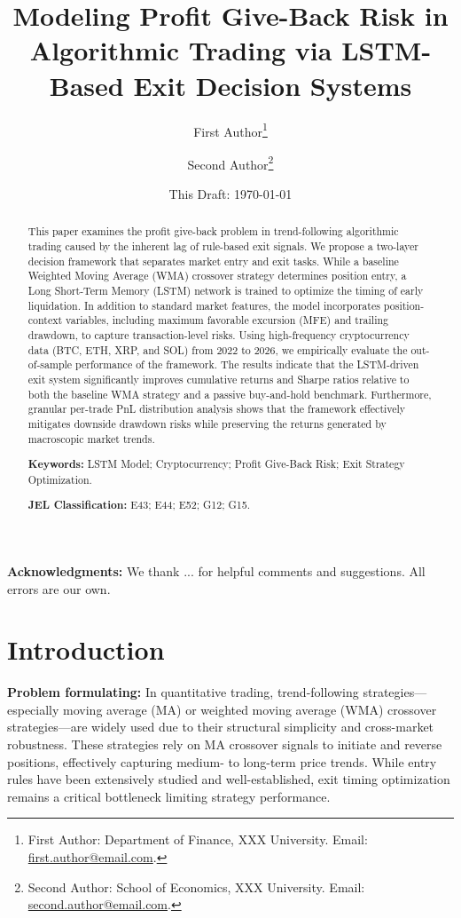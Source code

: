 \documentclass[12pt]{article}
\title{\textbf{Modeling Profit Give-Back Risk in Algorithmic Trading via LSTM-Based Exit Decision Systems}}
\author{
First Author\thanks{
First Author: Department of Finance, XXX University.
Email: \href{mailto:first.author@email.com}{first.author@email.com}.
}
\and
Second Author\thanks{
Second Author: School of Economics, XXX University.
Email: \href{mailto:second.author@email.com}{second.author@email.com}.
}
}
\date{
This Draft: \today
}
\begin{document}
\maketitle

\begin{abstract}
\noindent
This paper examines the profit give-back problem in trend-following algorithmic trading caused by the inherent lag of rule-based exit signals. We propose a two-layer decision framework that separates market entry and exit tasks. While a baseline Weighted Moving Average (WMA) crossover strategy determines position entry, a Long Short-Term Memory (LSTM) network is trained to optimize the timing of early liquidation. In addition to standard market features, the model incorporates position-context variables, including maximum favorable excursion (MFE) and trailing drawdown, to capture transaction-level risks. Using high-frequency cryptocurrency data (BTC, ETH, XRP, and SOL) from 2022 to 2026, we empirically evaluate the out-of-sample performance of the framework. The results indicate that the LSTM-driven exit system significantly improves cumulative returns and Sharpe ratios relative to both the baseline WMA strategy and a passive buy-and-hold benchmark. Furthermore, granular per-trade PnL distribution analysis shows that the framework effectively mitigates downside drawdown risks while preserving the returns generated by macroscopic market trends.
\vspace{0.5em}
\noindent

\textbf{Keywords:} LSTM Model; Cryptocurrency; Profit Give-Back Risk; Exit Strategy Optimization.

\vspace{0.5em}
\noindent
\textbf{JEL Classification:} E43; E44; E52; G12; G15.
\end{abstract}

\vspace{1em}

\noindent
\textbf{Acknowledgments:}
We thank ... for helpful comments and suggestions. All errors are our own.

\newpage

\section{Introduction}\label{sec:introduction}

\textbf{Problem formulating:} In quantitative trading, trend-following strategies—especially moving average (MA) or weighted moving average (WMA) crossover strategies—are widely used due to their structural simplicity and cross-market robustness. These strategies rely on MA crossover signals to initiate and reverse positions, effectively capturing medium- to long-term price trends. While entry rules have been extensively studied and well-established, exit timing optimization remains a critical bottleneck limiting strategy performance.
\end{document}

